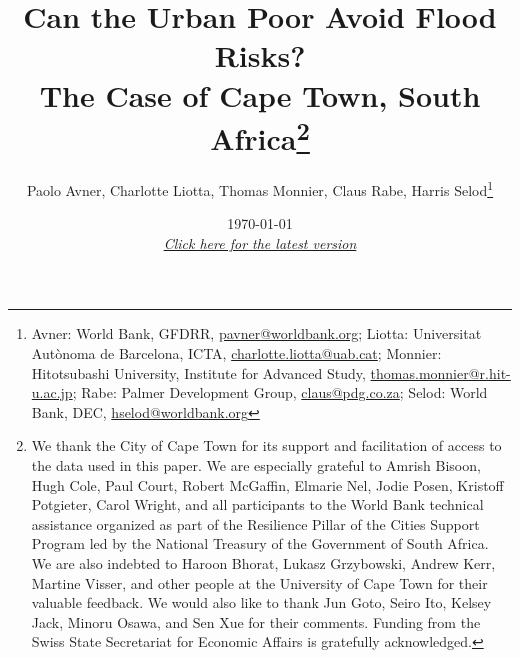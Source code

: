 \documentclass[12pt]{article}
\begin{document}
\title{Can the Urban Poor Avoid Flood Risks?\\ The Case of Cape Town, South Africa\thanks{We thank the City of Cape Town for its support and facilitation of access to the data used in this paper. We are especially grateful to Amrish Bisoon, Hugh Cole, Paul Court, Robert McGaffin, Elmarie Nel, Jodie Posen, Kristoff Potgieter, Carol Wright, and all participants to the World Bank technical assistance organized as part of the Resilience Pillar of the Cities Support Program led by the National Treasury of the Government of South Africa. We are also indebted to Haroon Bhorat, Lukasz Grzybowski, Andrew Kerr, Martine Visser, and other people at the University of Cape Town for their valuable feedback. We would also like to thank Jun Goto, Seiro Ito, Kelsey Jack, Minoru Osawa, and Sen Xue for their comments. Funding from the Swiss State Secretariat for Economic Affairs is gratefully acknowledged.}}



\author{Paolo Avner, Charlotte Liotta, Thomas Monnier, Claus Rabe, Harris Selod\thanks{Avner: World Bank, GFDRR, \href{mailto:pavner@worldbank.org}{pavner@worldbank.org}; Liotta: Universitat Autònoma de Barcelona, ICTA, \href{mailto:charlotte.liotta@uab.cat}{charlotte.liotta@uab.cat}; Monnier: Hitotsubashi University, Institute for Advanced Study, \href{mailto:thomas.monnier@r.hit-u.ac.jp}{thomas.monnier@r.hit-u.ac.jp}; Rabe: Palmer Development Group, \href{mailto:claus@pdg.co.za}{claus@pdg.co.za}; Selod: World Bank, DEC, \href{mailto:hselod@worldbank.org}{hselod@worldbank.org}}}


\date{\today\\ \href{https://tlmonnier.github.io/files/Monnier_InformalFloods.pdf}{\textit{Click here for the latest version}}}





\maketitle
\end{document}
